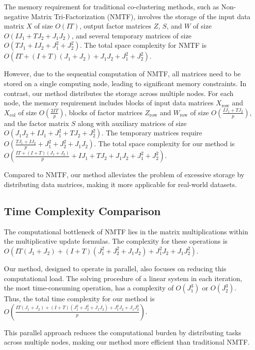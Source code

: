 \documentclass[journal]{IEEEtran}
\begin{document}
The memory requirement for traditional co-clustering methods, such as Non-negative Matrix Tri-Factorization (NMTF), involves the storage of the input data matrix $X$ of size $O(IT)$, output factor matrices $Z$, $S$, and $W$ of size $O(IJ_1 + TJ_2 + J_1J_2)$, and several temporary matrices of size $O(TJ_1 + IJ_2 + J_1^2 + J_2^2)$. The total space complexity for NMTF is $O(IT + (I + T)(J_1 + J_2) + J_1J_2 + J_1^2 + J_2^2)$.

However, due to the sequential computation of NMTF, all matrices need to be stored on a single computing node, leading to significant memory constraints. In contrast, our method distributes the storage across multiple nodes. For each node, the memory requirement includes blocks of input data matrices $X_{\text{row}}$ and $X_{\text{col}}$ of size $O\left(\frac{2IT}{p}\right)$, blocks of factor matrices $Z_{\text{row}}$ and $W_{\text{row}}$ of size $O\left(\frac{IJ_1 + TJ_2}{p}\right)$, and the factor matrix $S$ along with auxiliary matrices of size $O(J_1J_2 + IJ_1 + J_1^2 + TJ_2 + J_2^2)$. The temporary matrices require $O\left(\frac{TJ_1 + IJ_2}{p} + J_1^2 + J_2^2 + J_1J_2\right)$. The total space complexity for our method is $O\left(\frac{IT + (I + T)(J_1 + J_2)}{p} + IJ_1 + TJ_2 + J_1J_2 + J_1^2 + J_2^2\right)$.

Compared to NMTF, our method alleviates the problem of excessive storage by distributing data matrices, making it more applicable for real-world datasets.

\subsection{Time Complexity Comparison}

The computational bottleneck of NMTF lies in the matrix multiplications within the multiplicative update formulas. The complexity for these operations is $O(IT(J_1 + J_2) + (I + T)(J_1^2 + J_2^2 + J_1J_2) + J_1^2J_2 + J_1J_2^2)$.

Our method, designed to operate in parallel, also focuses on reducing this computational load. The solving procedure of a linear system in each iteration, the most time-consuming operation, has a complexity of $O(J_1^3)$ or $O(J_2^3)$. Thus, the total time complexity for our method is $O\left(\frac{IT(J_1 + J_2) + (I + T)(J_1^2 + J_2^2 + J_1J_2) + J_1^2J_2 + J_1J_2^2}{p}\right)$.

This parallel approach reduces the computational burden by distributing tasks across multiple nodes, making our method more efficient than traditional NMTF.
\end{document}
